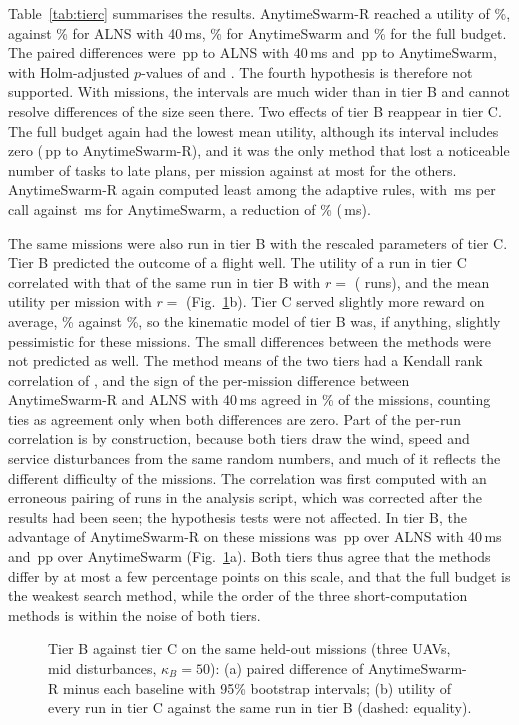 Table~\ref{tab:tierc} summarises the results. AnytimeSwarm-R reached a utility of \%, against
\% for ALNS with 40\,ms, \% for AnytimeSwarm and \% for the full budget.
The paired differences were \,pp to ALNS with 40\,ms and \,pp to AnytimeSwarm, with
Holm-adjusted $p$-values of  and . The fourth hypothesis is therefore not supported. With
 missions, the intervals are much wider than in tier B and cannot resolve differences of the size seen there.
Two effects of tier B reappear in tier C. The full budget again had the lowest mean utility, although its interval
includes zero (\,pp to AnytimeSwarm-R), and it was the only method that lost a noticeable number of tasks
to late plans,
 per mission against at most  for the others. AnytimeSwarm-R again computed least among
the adaptive rules, with \,ms per call against \,ms for AnytimeSwarm, a reduction of
\% (\,ms).


The same  missions were also run in tier B with the rescaled parameters of tier C. Tier B predicted the outcome
of a flight well. The utility of a run in tier C correlated with that of the same run in tier B with $r=$ 
( runs), and the mean utility per mission with $r=$  (Fig.~\ref{fig:bc}b). Tier C served
slightly more reward on average, \% against \%, so the kinematic model of tier B was, if anything,
slightly pessimistic for these missions. The small
differences between the methods were not predicted as well. The method means of the two tiers had a Kendall rank
correlation of , and the sign of the per-mission difference between AnytimeSwarm-R and ALNS with 40\,ms
agreed in \% of the missions, counting ties as agreement only when both differences are zero.
Part of the per-run correlation is by construction, because both tiers draw the wind, speed and service disturbances
from the same random numbers, and much of it reflects the different difficulty of the missions. The correlation was
first computed with an erroneous pairing of runs in the analysis script, which was corrected after the results had
been seen; the hypothesis tests were not affected. In tier B, the advantage of AnytimeSwarm-R on these missions
was \,pp over ALNS with 40\,ms and \,pp over AnytimeSwarm (Fig.~\ref{fig:bc}a). Both
tiers thus agree that the methods differ by at most a few percentage points on this scale, and that the full budget is
the weakest search method, while the order of the three short-computation methods is within the noise of both tiers.

\begin{figure}[t]
\centering
{}
\caption{Tier B against tier C on the same  held-out missions (three UAVs, mid disturbances, $\kappa_B=50$):
(a) paired difference of AnytimeSwarm-R minus each baseline with 95\% bootstrap intervals; (b) utility of every run in
tier C against the same run in tier B (dashed: equality).}\label{fig:bc}
\end{figure}
